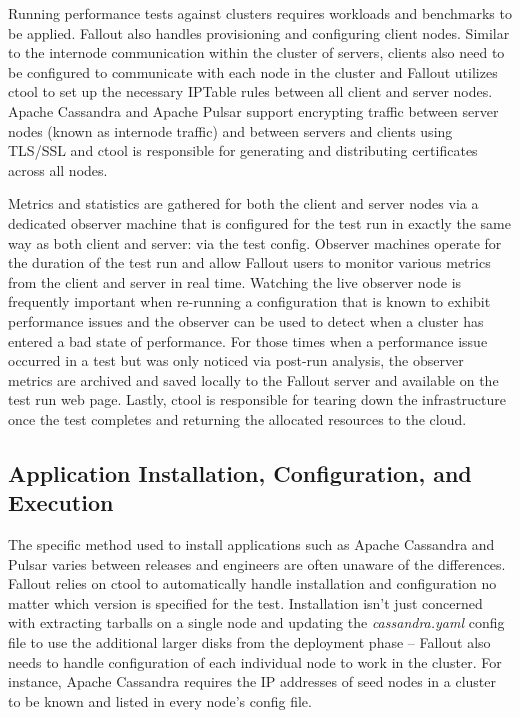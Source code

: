 \documentclass[a4paper,fleqn]{cas-dc}
\begin{document}
Running performance tests against clusters requires workloads and benchmarks to be applied.
Fallout also handles provisioning and configuring client nodes. Similar to the internode
communication within the cluster of servers, clients also need to be configured to communicate with
each node in the cluster and Fallout utilizes ctool to set up the necessary IPTable rules between all
client and server nodes. Apache Cassandra and Apache Pulsar support encrypting traffic between
server nodes (known as internode traffic) and between servers and clients using TLS/SSL and ctool is
responsible for generating and distributing certificates across all nodes.

Metrics and statistics are gathered for both the client and server nodes via a dedicated observer
machine that is configured for the test run in exactly the same way as both client and server: via
the test config. Observer machines operate for the duration of the test run and allow Fallout users
to monitor various metrics from the client and server in real time. Watching the live observer node
is frequently important when re-running a configuration that is known to exhibit performance issues
and the observer can be used to detect when a cluster has entered a bad state of performance. For
those times when a performance issue occurred in a test but was only noticed via post-run analysis,
the observer metrics are archived and saved locally to the Fallout server and available on the test
run web page. Lastly, ctool is responsible for tearing down the infrastructure once the test
completes and returning the allocated resources to the cloud.

\subsection{Application Installation, Configuration, and Execution}

The specific method used to install applications such as Apache Cassandra and Pulsar varies between
releases and engineers are often unaware of the differences. Fallout relies on ctool to
automatically handle installation and configuration no matter which version is specified for the
test. Installation isn’t just concerned with extracting tarballs on a single node and updating the
\emph{cassandra.yaml} config file to use the additional larger disks from the deployment phase --
Fallout also needs to handle configuration of each individual node to work in the cluster. For
instance, Apache Cassandra requires the IP addresses of seed nodes in a cluster to be known and
listed in every node’s config file.
\end{document}
